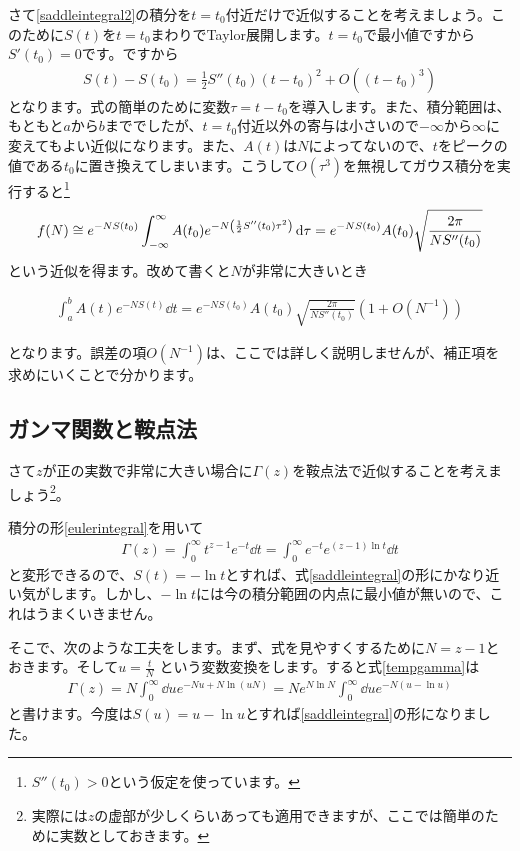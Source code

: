 \documentclass[report,paper=a4, fontsize=12pt, line_length=16cm, number_of_lines=33,dvipdfmx]{jlreq}
\newenvironment{important}{\begin{tcolorbox}[
  colback = white,
  colframe = red!35,
  boxrule = 2mm,
  fonttitle = \bfseries,
  after = \noindent] }{\end{tcolorbox}}
\numberwithin{equation}{section}
\begin{document}
さて\eqref{saddleintegral2}の積分を$t=t_0$付近だけで近似することを考えましょう。このために$S(t)$を$t=t_0$まわりでTaylor展開します。$t=t_0$で最小値ですから$S'(t_0)=0$です。ですから
\begin{align}
  S(t)-S(t_0)=\frac12 S''(t_0) (t-t_0)^2+O((t-t_0)^3)
\end{align}
となります。式の簡単のために変数$\tau=t-t_0$を導入します。また、積分範囲は、もともと$a$から$b$まででしたが、$t=t_0$付近以外の寄与は小さいので$-\infty$から$\infty$に変えてもよい近似になります。また、$A(t)$は$N$によってないので、$t$をピークの値である$t_0$に置き換えてしまいます。こうして$O(\tau^3)$を無視してガウス積分を実行すると\footnote{$S''(t_0)>0$という仮定を使っています。}
\begin{align}
  f(N)\cong e^{-NS(t_0)}\int_{-\infty}^{\infty}A(t_0)e^{-N\qty( \frac12 S''(t_0) \tau^2)}\dd{\tau}
  =e^{-NS(t_0)}A(t_0)\sqrt{\frac{2\pi}{NS''(t_0)}}
\end{align}
という近似を得ます。改めて書くと$N$が非常に大きいとき
\begin{important}
  \begin{align}
    \int_{a}^{b}A(t)e^{-N S(t)}\dd{t}=e^{-NS(t_0)}A(t_0)\sqrt{\frac{2\pi}{NS''(t_0)}}(1+O(N^{-1}))
  \end{align}
\end{important}
となります。誤差の項$O(N^{-1})$は、ここでは詳しく説明しませんが、補正項を求めにいくことで分かります。

\subsection{ガンマ関数と鞍点法}
さて$z$が正の実数で非常に大きい場合に$\Gamma(z)$を鞍点法で近似することを考えましょう\footnote{実際には$z$の虚部が少しくらいあっても適用できますが、ここでは簡単のために実数としておきます。}。

積分の形\eqref{eulerintegral}を用いて
\begin{align}
  \Gamma(z)
  =\int_{0}^{\infty}t^{z-1}e^{-t}\dd{t}
  =\int_{0}^{\infty}e^{-t}e^{(z-1)\ln t}\dd{t}\label{tempgamma}
\end{align}
と変形できるので、$S(t)=-\ln t$とすれば、式\eqref{saddleintegral}の形にかなり近い気がします。しかし、$-\ln t$には今の積分範囲の内点に最小値が無いので、これはうまくいきません。

そこで、次のような工夫をします。まず、式を見やすくするために$N=z-1$とおきます。そして$u=\frac{t}{N}$ という変数変換をします。すると式\eqref{tempgamma}は
\begin{align}
  \Gamma(z)
  =N\int_{0}^{\infty}\dd{u}e^{-Nu+N\ln(uN)}
  =Ne^{N\ln N}\int_{0}^{\infty}\dd{u}e^{-N(u-\ln u)}\label{tempgamma2}
\end{align}
と書けます。今度は$S(u)=u-\ln u$とすれば\eqref{saddleintegral}の形になりました。
\end{document}
